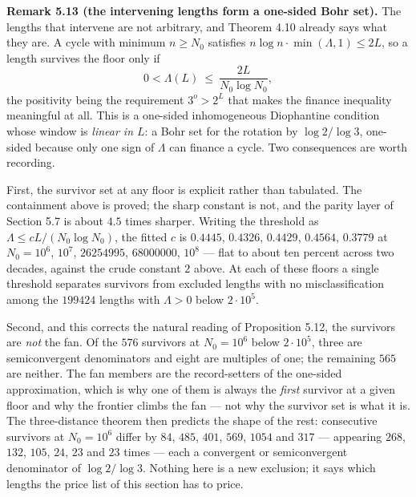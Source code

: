 \documentclass[12pt]{article}
\begin{document}
\textbf{Remark 5.13 (the intervening lengths form a one-sided Bohr
set).} The lengths that intervene are not arbitrary, and Theorem 4.10
already says what they are. A cycle with minimum \(n\ge N_0\) satisfies
\(n\log n\cdot\min(\Lambda,1)\le 2L\), so a length survives the floor
only if \[
0<\Lambda(L)\ \le\ \frac{2L}{N_0\log N_0},
\] the positivity being the requirement \(3^{o}>2^{L}\) that makes the
finance inequality meaningful at all. This is a one-sided inhomogeneous
Diophantine condition whose window is \emph{linear in \(L\)}: a Bohr set
for the rotation by \(\log 2/\log 3\), one-sided because only one sign
of \(\Lambda\) can finance a cycle. Two consequences are worth
recording.

First, the survivor set at any floor is explicit rather than tabulated.
The containment above is proved; the sharp constant is not, and the
parity layer of Section 5.7 is about \(4.5\) times sharper. Writing the
threshold as \(\Lambda\le cL/(N_0\log N_0)\), the fitted \(c\) is
\(0.4445\), \(0.4326\), \(0.4429\), \(0.4564\), \(0.3779\) at
\(N_0=10^6\), \(10^7\), \(26254995\), \(68000000\), \(10^8\) --- flat to
about ten percent across two decades, against the crude constant \(2\)
above. At each of these floors a single threshold separates survivors
from excluded lengths with no misclassification among the \(199424\)
lengths with \(\Lambda>0\) below \(2\cdot 10^5\).

Second, and this corrects the natural reading of Proposition 5.12, the
survivors are \emph{not} the fan. Of the \(576\) survivors at
\(N_0=10^6\) below \(2\cdot10^5\), three are semiconvergent denominators
and eight are multiples of one; the remaining \(565\) are neither. The
fan members are the record-setters of the one-sided approximation, which
is why one of them is always the \emph{first} survivor at a given floor
and why the frontier climbs the fan --- not why the survivor set is what
it is. The three-distance theorem then predicts the shape of the rest:
consecutive survivors at \(N_0=10^6\) differ by \(84\), \(485\),
\(401\), \(569\), \(1054\) and \(317\) --- appearing \(268\), \(132\),
\(105\), \(24\), \(23\) and \(23\) times --- each a convergent or
semiconvergent denominator of \(\log 2/\log 3\). Nothing here is a new
exclusion; it says which lengths the price list of this section has to
price.

\begingroup\small
\end{document}

